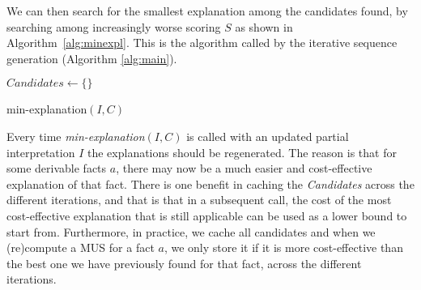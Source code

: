 We can then search for the smallest explanation among the candidates found, by searching among increasingly worse scoring $S$ as shown in Algorithm~\ref{alg:minexpl}. This is the algorithm called by the iterative sequence generation (Algorithm \ref{alg:main}).

\begin{algorithm}


  $\mathit{Candidates}\gets \{\}$\;
  \caption{min-explanation$(I,C)$}
  \label{alg:minexpl}
\end{algorithm}

Every time \textit{min-explanation$(I,C)$} is called with an updated partial interpretation $I$ the explanations should be regenerated. The reason is that for some derivable facts $a$, there may now be a much easier and cost-effective explanation of that fact.
There is one benefit in caching the \textit{Candidates} across the different iterations, and that is that in a subsequent call, the cost of the most cost-effective explanation that is still applicable can be used as a lower bound to start from.
Furthermore, in practice, we cache all candidates and when we (re)compute a MUS for a fact $a$, we only store it if it is more cost-effective than the best one we have previously found for that fact, across the different iterations.


